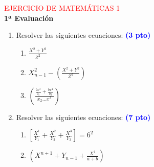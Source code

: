 \documentclass[10pt,a4paper]{article}
\begin{document}
\begin{center}
\textcolor{red}{\LARGE EJERCICIO DE MATEMÁTICAS 1}\\
\vspace{0,8cm}
\textbf{\Large 1ª Evaluación}
\end{center}
\bigskip

\begin{enumerate}
\item Resolver las siguientes ecuaciones:	\textcolor{blue}{\bf{(3 pto)}}
\begin{enumerate}
\item $\frac{X^2+Y^2}{Z^2}$
\item $X^2_{n-1}-(\frac{X^2+Y^2}{Z^2})$
\item $\left( \frac{\frac{bx^3}{b_1}+\frac{bx^4}{b_2}}{x_2 \ldots x^3} \right)$
\end{enumerate}
\item Resolver las siguientes ecuaciones:
\textcolor{blue}{\bf{(7 pto)}}
\begin{enumerate}
\item $\left[ \frac{X^1}{Y_1}+\frac{X^2}{Y_2}+\frac{X^3}{Y_3} \right]=6^2$
\item $\left( X^{n+1}+Y_{n-1}+\frac{X^4}{a+b} \right)$
\end{enumerate}
\end{enumerate}
\end{document}
